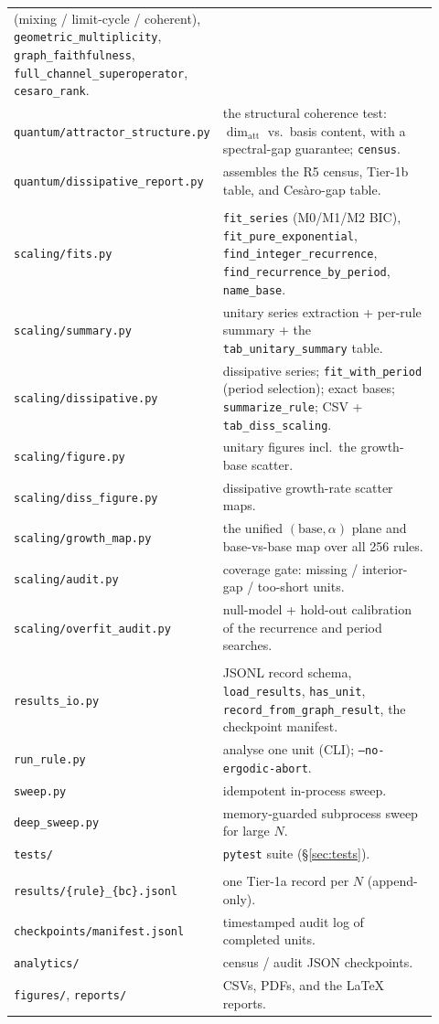 \documentclass[11pt]{article}
\newcommand{\pf}[1]{\texttt{#1}}          %
\newcommand{\fn}[1]{\texttt{#1}}          %
\begin{document}
\begin{center}
\begin{longtable}{@{}>{\footnotesize}p{0.29\linewidth} p{0.63\linewidth}@{}}
(mixing / limit-cycle / coherent), \fn{geometric\_multiplicity},
\fn{graph\_faithfulness}, \fn{full\_channel\_superoperator}, \fn{cesaro\_rank}. \\
\pf{quantum/attractor\_structure.py} & the structural coherence test:
$\dim_{\text{att}}$ vs.\ basis content, with a spectral-gap guarantee;
\fn{census}. \\
\pf{quantum/dissipative\_report.py} & assembles the R5 census, Tier-1b table, and
Ces\`aro-gap table. \\
\addlinespace
\multicolumn{2}{@{}l}{\textbf{scaling/} --- Tier 1c}\\
\pf{scaling/fits.py} & \fn{fit\_series} (M0/M1/M2 BIC), \fn{fit\_pure\_exponential},
\fn{find\_integer\_recurrence}, \fn{find\_recurrence\_by\_period}, \fn{name\_base}. \\
\pf{scaling/summary.py} & unitary series extraction + per-rule summary + the
\pf{tab\_unitary\_summary} table. \\
\pf{scaling/dissipative.py} & dissipative series; \fn{fit\_with\_period} (period
selection); exact bases; \fn{summarize\_rule}; CSV + \pf{tab\_diss\_scaling}. \\
\pf{scaling/figure.py} & unitary figures incl.\ the growth-base scatter. \\
\pf{scaling/diss\_figure.py} & dissipative growth-rate scatter maps. \\
\pf{scaling/growth\_map.py} & the unified $(\text{base},\alpha)$ plane and
base-vs-base map over all 256 rules. \\
\pf{scaling/audit.py} & coverage gate: missing / interior-gap / too-short units. \\
\pf{scaling/overfit\_audit.py} & null-model + hold-out calibration of the
recurrence and period searches. \\
\addlinespace
\multicolumn{2}{@{}l}{\textbf{drivers and I/O}}\\
\pf{results\_io.py} & JSONL record schema, \fn{load\_results}, \fn{has\_unit},
\fn{record\_from\_graph\_result}, the checkpoint manifest. \\
\pf{run\_rule.py} & analyse one unit (CLI); \fn{--no-ergodic-abort}. \\
\pf{sweep.py} & idempotent in-process sweep. \\
\pf{deep\_sweep.py} & memory-guarded subprocess sweep for large $N$. \\
\pf{tests/} & \fn{pytest} suite (\S\ref{sec:tests}). \\
\midrule
\multicolumn{2}{@{}l}{\textbf{outputs (repo root)}}\\
\pf{results/\{rule\}\_\{bc\}.jsonl} & one Tier-1a record per $N$ (append-only). \\
\pf{checkpoints/manifest.jsonl} & timestamped audit log of completed units. \\
\pf{analytics/} & census / audit JSON checkpoints. \\
\pf{figures/}, \pf{reports/} & CSVs, PDFs, and the LaTeX reports. \\
\bottomrule
\end{longtable}
\end{center}
\end{document}

